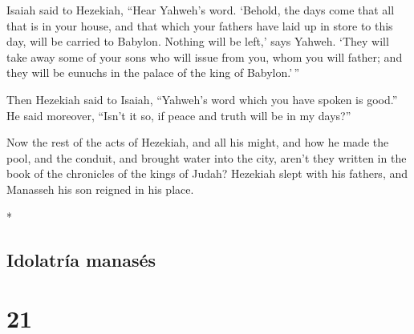 \begin{paracol}{2}
\begin{otherlanguage}{english}
 Isaiah said to Hezekiah, ``Hear Yahweh's word.
 `Behold, the days come that all that is in your house,
and that which your fathers have laid up in store to this day, will be
carried to Babylon. Nothing will be left,' says Yahweh. 
`They will take away some of your sons who will issue from you, whom you
will father; and they will be eunuchs in the palace of the king of
Babylon.'\,''

 Then Hezekiah said to Isaiah, ``Yahweh's word which you
have spoken is good.'' He said moreover, ``Isn't it so, if peace and
truth will be in my days?''

 Now the rest of the acts of Hezekiah, and all his might,
and how he made the pool, and the conduit, and brought water into the
city, aren't they written in the book of the chronicles of the kings of
Judah?  Hezekiah slept with his fathers, and Manasseh his
son reigned in his place.

\end{otherlanguage}

\switchcolumn[0]*

\hypertarget{idolatruxeda-manasuxe9s}{%
\subsection{Idolatría manasés}\label{idolatruxeda-manasuxe9s}}

\hypertarget{section-40}{%
\section{21}\label{section-40}}


\end{paracol}
